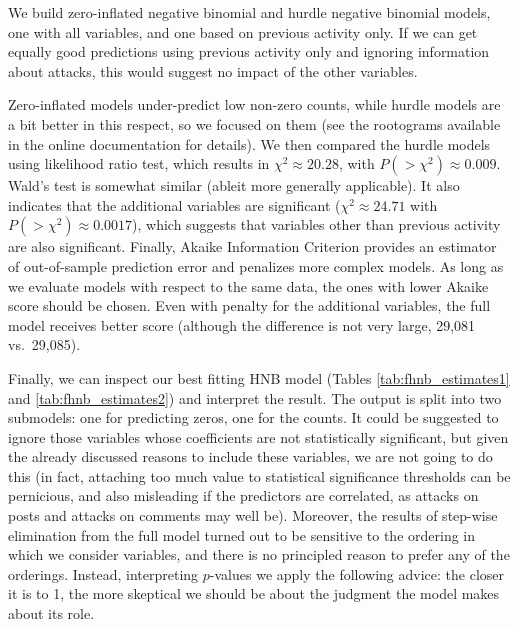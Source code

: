 \documentclass[a4paper,fleqn]{cas-dc}
\begin{document}
We build zero-inflated negative binomial and hurdle negative binomial
models, one with all variables, and one based on previous activity only.
If we can get equally good predictions using previous activity only and
ignoring information about attacks, this would suggest no impact of the
other variables.


Zero-inflated models under-predict low non-zero counts, while hurdle
models are a bit better in this respect, so we focused on them (see the
rootograms available in the online documentation for details). We then
compared the hurdle models using likelihood ratio test, which results in
\(\chi^2 \approx 20.28\), with \(P(>\chi^2)\approx 0.009\). Wald's test
is somewhat similar (ableit more generally applicable). It also
indicates that the additional variables are significant
(\(\chi^2 \approx 24.71\) with \(P(>\chi^2)\approx 0.0017\)), which
suggests that variables other than previous activity are also
significant. Finally, Akaike Information Criterion \citep{Akaike1974model}
provides an estimator of out-of-sample prediction error and penalizes
more complex models. As long as we evaluate models with respect to the
same data, the ones with lower Akaike score should be chosen. Even with
penalty for the additional variables, the full model receives better
score (although the difference is not very large, 29,081 vs.~29,085).

Finally, we can inspect our best fitting HNB model (Tables
\ref{tab:fhnb_estimates1} and \ref{tab:fhnb_estimates2}) and interpret
the result. The output is split into two submodels: one for predicting
zeros, one for the counts. It could be suggested to ignore those
variables whose coefficients are not statistically significant, but
given the already discussed reasons to include these variables, we are
not going to do this (in fact, attaching too much value to statistical
significance thresholds can be pernicious, and also misleading if the
predictors are correlated, as attacks on posts and attacks on comments
may well be). Moreover, the results of step-wise elimination from the
full model turned out to be sensitive to the ordering in which we consider variables,
and there is no principled reason to prefer any of the orderings.
Instead, interpreting \(p\)-values we apply the following advice: the
closer it is to 1, the more skeptical we should be about the judgment
the model makes about its role.
\end{document}
